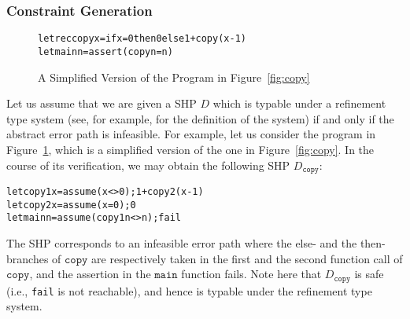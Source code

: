 \subsubsection{Constraint Generation}
\label{sec:cg}

\begin{figure}[t]
\begin{alltt}
letrec copy x = if x=0 then 0 else 1 + copy (x-1)
let main n = assert (copy n = n)
\end{alltt}
\caption{A Simplified Version of the Program in Figure~\ref{fig:copy}}
\label{fig:copy2}
\end{figure}

Let us assume that we are given a SHP \(D\) which is typable under a
refinement type system (see, for example, \cite{Unno2009} for the
definition of the system) if and only if the abstract error path is
infeasible.  For example, let us consider the program in
Figure~\ref{fig:copy2}, which is a simplified version of the one in
Figure~\ref{fig:copy}.  In the course of its verification, we may obtain
the following SHP \(D_{\texttt{copy}}\):
\begin{alltt}
 let copy1 x = assume (x<>0); 1 + copy2 (x-1)
 let copy2 x = assume (x=0); 0
 let main n = assume (copy1 n <> n); fail
\end{alltt}
The SHP corresponds to an infeasible error path where the else- and the
then-branches of \(\texttt{copy}\) are respectively taken in the first
and the second function call of \(\texttt{copy}\), and the assertion in
the \(\texttt{main}\) function fails.  Note here that
\(D_{\texttt{copy}}\) is safe (i.e., \texttt{fail} is not reachable),
and hence is typable under the refinement type system.

